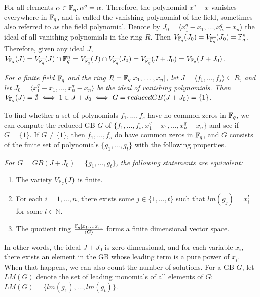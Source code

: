 For all elements $\alpha \in {\mathbb{F}}_{q}, \alpha^q = \alpha$. Therefore, the
polynomial $x^q-x$ vanishes everywhere in ${\mathbb{F}}_{q}$, and is called the
vanishing polynomial of the field, sometimes also referred to as the
field polynomial. Denote by $J_0 = \langle
x_1^q-x_1,\dots,x_n^q-x_n\rangle$ the ideal of all vanishing
polynomials in the ring $R$. Then $V_{{\mathbb{F}}_{q}}(J_0) = V_{{\overline{{\mathbb{F}}_q}}}(J_0) =
{\mathbb{F}}_{q}^n$. Therefore, given any ideal $J$, $V_{{\mathbb{F}}_{q}}(J) = V_{{\overline{{\mathbb{F}}_q}}}(J)
\cap{\mathbb{F}}_{q}^n = V_{{\overline{{\mathbb{F}}_q}}}(J) \cap V_{{\overline{{\mathbb{F}}_q}}}(J_0) = V_{{\overline{{\mathbb{F}}_q}}}(J+J_0) =
V_{{\mathbb{F}}_{q}}(J+J_0)$. 



\begin{Theorem}
\label{thm:weak-ns-ff}
{\it For a finite field ${\mathbb{F}}_{q}$ and the ring $R = {\mathbb{F}}_{q}[x_1, \dots, x_n]$, let
$J = \langle f_1, \dots, f_s\rangle \subseteq R$, and let $J_0 = \langle
x_1^q-x_1, \dots, x_n^q -  x_n\rangle$ be the ideal of vanishing
polynomials. Then $V_{{\mathbb{F}}_{q}}(J) = \emptyset \iff 1 \in J + J_0 \iff G =
reducedGB(J+J_0) = \{1\}$. }
\end{Theorem}

To find whether a set of polynomials $f_1,\dots,f_s$ have no common
zeros in ${\mathbb{F}}_{q}$, we can compute the reduced GB $G$ of
$\{f_1,\dots,f_s,x_1^q-x_1,\dots,x_n^q-x_n\}$ and see if $G = \{1\}$. If
$G\neq\{1\}$, then $f_1,\dots,f_s$ do have common zeros in ${\mathbb{F}}_{q}$, and
$G$ consists of the finite set of polynomials $\{g_1,\dots,g_t\}$ with the
following properties. 

\begin{Theorem}
\label{thm:gb-finite}
{\it For $G = GB(J+J_0) = \{g_1,\dots,g_t\}$, the following statements
  are equivalent:
\begin{enumerate}
\item The variety $V_{{\mathbb{F}}_{q}}(J)$ is finite.
\item For each $i = 1,\dots, n$, there exists some
$j\in\{1,\dots,t\}$ such that $lm(g_j) = x_i^l$ for some $l\in
\mathbb{N}$. 
\item The quotient ring ${{\mathbb{F}}_{q}[x_1\dots,x_n]}\over{\langle G\rangle}$ forms a
  finite dimensional vector space.
\end{enumerate}
}
\end{Theorem}

In other words, the ideal $J+J_0$ is zero-dimensional, and for each
variable $x_i$, there exists an element in the GB whose leading term
is a pure power of $x_i$. When that happens, we can also count the
number of solutions. For a GB $G$, let $LM(G)$ denote the set of 
 leading monomials of all elements of $G$: $LM(G) =
 \{lm(g_1),\dots,lm(g_t)\}$.  

